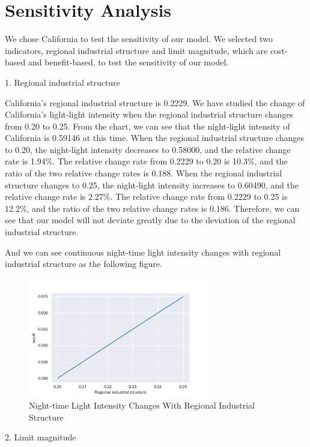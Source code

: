 \MinParskip{}

\section{Sensitivity Analysis}

We chose California to test the sensitivity of our model. We selected two indicators, regional industrial structure and limit magnitude, which are cost-based and benefit-based, to test the sensitivity of our model.

1. Regional industrial structure

California's regional industrial structure is 0.2229. We have studied the change of California's light-light intensity when the regional industrial structure changes from 0.20 to 0.25. From the chart, we can see that the night-light intensity of California is 0.59146 at this time. When the regional industrial structure changes to 0.20, the night-light intensity decreases to 0.58000, and the relative change rate is 1.94\%. The relative change rate from 0.2229 to 0.20 is 10.3\%, and the ratio of the two relative change rates is 0.188. When the regional industrial structure changes to 0.25, the night-light intensity increases to 0.60490, and the relative change rate is 2.27\%. The relative change rate from 0.2229 to 0.25 is 12.2\%, and the ratio of the two relative change rates is 0.186. Therefore, we can see that our model will not deviate greatly due to the deviation of the regional industrial structure.

And we can see continuous night-time light intensity changes with regional industrial structure as the following figure.
\begin{figure}[H]\centering
    \includegraphics[width=0.7\textwidth]{figures/Regional_industrial_structure.png}
    \caption{Night-time Light Intensity Changes With Regional Industrial Structure} \label{fig:figure7}
\end{figure}
2. Limit magnitude

